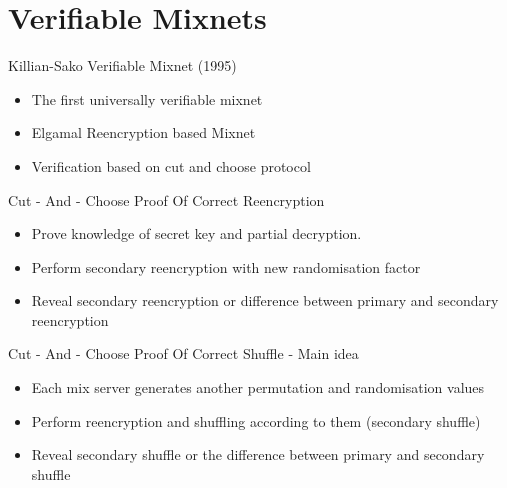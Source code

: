 \documentclass{beamer}
\newcommand*{\addsp}{\usebeamertemplate*{section page1}}
\begin{document}
\section{Verifiable Mixnets}
\begin{frame}
\addsp
\end{frame}

\begin{frame}[allowframebreaks]{Killian-Sako Verifiable Mixnet (1995)}
\begin{itemize}
\item The first universally verifiable mixnet
\item Elgamal Reencryption based Mixnet 
\item Verification based on cut and choose protocol
\end{itemize}
\begin{block}{Cut - And - Choose Proof Of Correct Reencryption}
\begin{itemize}
\item Prove knowledge of secret key and partial decryption.
\item Perform secondary reencryption with new randomisation factor
\item Reveal secondary reencryption or difference between primary and secondary reencryption
\end{itemize}
\end{block}

\begin{block}{Cut - And - Choose Proof Of Correct Shuffle - Main idea}
\begin{itemize}
\item Each mix server generates another permutation and randomisation values
\item Perform reencryption and shuffling according to them (secondary shuffle)
\item Reveal secondary shuffle or the difference between primary and secondary shuffle
\end{itemize}
\end{block}
\end{frame}
\end{document}
